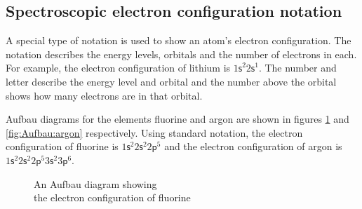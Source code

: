\subsection*{Spectroscopic electron configuration notation}
        \label{m38741*id259749}A special type of notation is used to show an atom's electron configuration. The notation describes the energy levels, orbitals and the number of electrons in each. For example, the electron configuration of lithium is ${1\mathsf{s}}^{2}{2\mathsf{s}}^{1}$. The number and letter describe the energy level and orbital and the number above the orbital shows how many electrons are in that orbital. 

Aufbau diagrams for the elements fluorine and argon are shown in figures \ref{fig:Aufbau:fluorine} and \ref{fig:Aufbau:argon} respectively. Using standard notation, the electron configuration of fluorine is $1\mathsf{s}^{2}{2}\mathsf{s}^{2}2\mathsf{p}^{5}$ and the electron configuration of argon is $1\mathsf{s}^{2}{2}\mathsf{s}^{2}2\mathsf{p}^{5}{3}\mathsf{s}^{2}3\mathsf{p}^{6}$. \\
\begin{minipage}{.5\textwidth}
\begin{figure}[H]
\begin{center}

\caption{An Aufbau diagram showing \\ the electron configuration of fluorine}
\label{fig:Aufbau:fluorine}
\end{center}
\end{figure}
\end{minipage}
